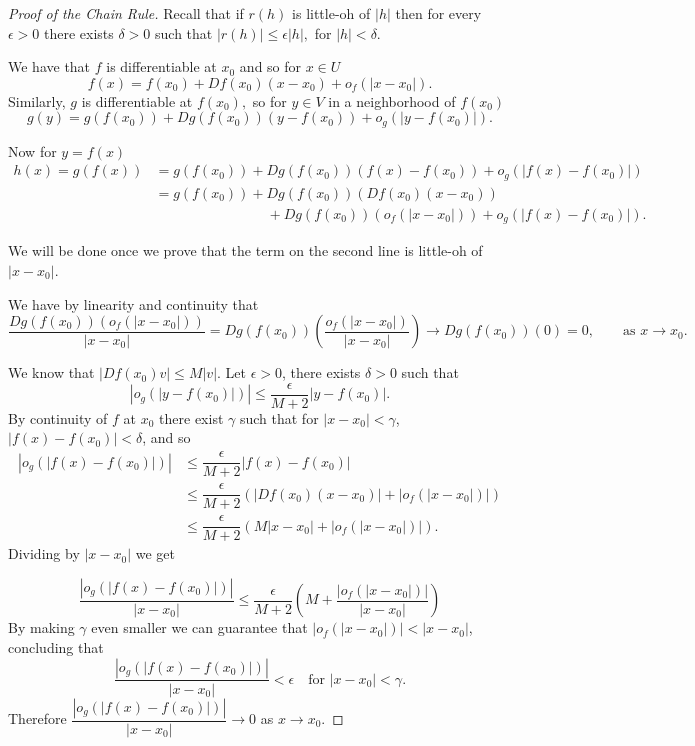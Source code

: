\documentclass[11pt,openany]{book}
\theoremstyle{plain}
\theoremstyle{definition}
\theoremstyle{remark}
\begin{document}
\begin{proof}[Proof of the Chain Rule]
    Recall that if $r(h)$ is little-oh of $|h|$
    then for every $\epsilon>0$ there exists $\delta>0$ such that $|r(h)|\leq \epsilon |h|,$ for $|h|<\delta$.

    We have that $f$ is differentiable at $x_0$ and so for $x\in U$
    $$f(x)=f(x_0)+Df(x_0)(x-x_0)+o_f(|x-x_0|).$$
    Similarly, $g$ is differentiable at $f(x_0),$ so for $y\in V$ in a neighborhood of $f(x_0)$
    $$g(y)=g(f(x_0))+Dg(f(x_0))(y-f(x_0))+o_g(|y-f(x_0)|).$$

    Now for $y=f(x)$
    \begin{align*}
        h(x)=g(f(x))&=g(f(x_0))+Dg(f(x_0))(f(x)-f(x_0))+o_g(|f(x)-f(x_0)|)\\
        &=g(f(x_0))+Dg(f(x_0))(Df(x_0)(x-x_0))\\
        &\qquad\qquad\qquad\qquad+Dg(f(x_0))(o_f(|x-x_0|))+o_g(|f(x)-f(x_0)|).
    \end{align*}

We will be done once we prove that the term on the second line is little-oh of $|x-x_0|$.
    
    We have by linearity and continuity that
    $$\dfrac{Dg(f(x_0))(o_f(|x-x_0|))}{|x-x_0|}=Dg(f(x_0))\left(\dfrac{o_f(|x-x_0|)}{|x-x_0|}\right)\to Dg(f(x_0))(0)=0, \qquad \text{as $x\to x_0$.}$$


We know that $|Df(x_0)v|\leq M|v|.$
    Let $\epsilon>0$, there exists  $\delta>0$ such that $$|o_g(|y-f(x_0)|)|\leq \dfrac{\epsilon}{M+2} |y-f(x_0)|.$$ By continuity of $f$ at $x_0$ there exist $\gamma$ such that for $|x-x_0|<\gamma$, $|f(x)-f(x_0)|<\delta$, and so
    \begin{align*}
    |o_g(|f(x)-f(x_0)|)|&\leq \dfrac{\epsilon}{M+2} |f(x)-f(x_0)|\\
    &\leq \dfrac{\epsilon}{M+2}( |Df(x_0)(x-x_0)|+|o_f(|x-x_0|)|)\\
    &\leq \dfrac{\epsilon}{M+2}(M|x-x_0|+|o_f(|x-x_0|)|).
    \end{align*}
    Dividing by $|x-x_0|$ we get
    
    $$
    \dfrac{|o_g(|f(x)-f(x_0)|)|}{|x-x_0|}\leq \dfrac{\epsilon}{M+2}\left(M+\dfrac{|o_f(|x-x_0|)|}{|x-x_0|}\right)
    $$
    By making $\gamma$ even smaller we can guarantee that $|o_f(|x-x_0|)|<|x-x_0|$, concluding that
    $$\dfrac{|o_g(|f(x)-f(x_0)|)|}{|x-x_0|}<\epsilon\quad \text{for $|x-x_0|<\gamma$}.$$
    Therefore $\dfrac{|o_g(|f(x)-f(x_0)|)|}{|x-x_0|}\to 0$ as $x\to x_0$.
    \end{proof}
\end{document}
